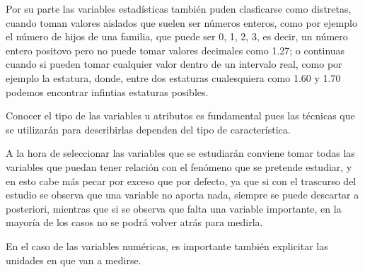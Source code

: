 \begin{frame}
{Por su parte las variables estadísticas también puden clasficarse como distretas, cuando toman valores aislados que
suelen ser números enteros, como por ejemplo el número de hijos de una familia, que puede ser 0, 1, 2, 3, es decir, un
número entero positovo pero no puede tomar valores decimales como 1.27; o continuas cuando si pueden tomar cualquier
valor dentro de un intervalo real, como por ejemplo la estatura, donde, entre dos estaturas cualesquiera como 1.60 y
1.70 podemos encontrar infintias estaturas posibles.

Conocer el tipo de las variables u atributos es fundamental pues las técnicas que se utilizarán
para describirlas dependen del tipo de característica.

A la hora de seleccionar las variables que se estudiarán conviene tomar todas las variables que puedan tener relación
con el fenómeno que se pretende estudiar, y en esto cabe más pecar por exceso que por defecto, ya que si con el
trascurso del estudio se observa que una variable no aporta nada, siempre se puede descartar a posteriori, mientras que
si se observa que falta una variable importante, en la mayoría de los casos no se podrá volver atrás para
medirla.

En el caso de las variables numéricas, es importante también explicitar las unidades en que van a medirse. 
}
\end{frame}


